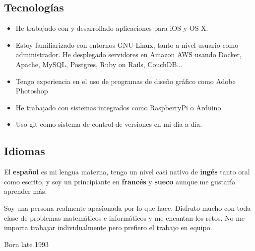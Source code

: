 \documentclass[a4paper, 10pt]{article}
\newcommand{\CVSubsection}[1]{ {\setromanfont[Numbers=Uppercase]{Helvetica}\selectfont \subsection*{#1}} }
\begin{document}
\CVSubsection{Tecnologías}

\begin{multicols}{2}
	
	\begin{itemize}

		\item He trabajado con y desarrollado aplicaciones para iOS y OS X.

		\item Estoy familiarizado con entornos GNU Linux, tanto a nivel usuario como administrador. He desplegado servidores en Amazon AWS usando Docker, Apache, MySQL, Postgres, Ruby on Rails, CouchDB...

		\item Tengo experiencia en el uso de programas de diseño gráfico como Adobe Photoshop

		\item He trabajado con sistemas integrados como RaspberryPi o Arduino

		\item Uso git como sistema de control de versiones en mi día a día.


	\end{itemize}

\end{multicols}

\CVSubsection{Idiomas}

El \textbf{español} es mi lengua materna, tengo un nivel casi nativo de \textbf{ingés} tanto oral como escrito, y soy un principiante en \textbf{francés} y \textbf{sueco} aunque me gustaría aprender más.


\begin{huge}
	Soy una persona realmente apasionada por lo que hace. Disfruto mucho con toda clase de problemas matemáticos e informáticos y me encantan los retos. No me importa trabajar individualmente pero prefiero el trabajo en equipo.
\end{huge}

%
%



\pagebreak


Born late 1993
\end{document}
